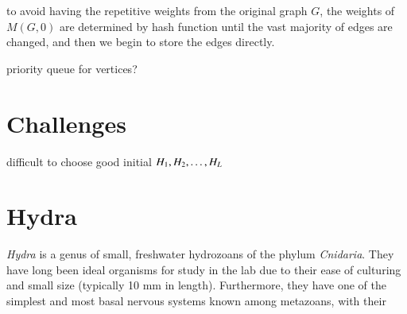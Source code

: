 \documentclass{article}
\begin{document}
to avoid having the repetitive weights from the original graph $G$, the weights of $M(G,0)$ are determined by hash function until the vast majority of edges are changed, and then we begin to store the edges directly.


priority queue for vertices?


\section{Challenges}

difficult to choose good initial $H_1, H_2, \ldots, H_{L}$
\newpage

\section{Hydra}
\textit{Hydra} is a genus of small, freshwater hydrozoans of the phylum \textit{Cnidaria}. They have long been ideal organisms for study in the lab due to their ease of culturing and small size (typically 10 mm in length). Furthermore, they have one of the simplest and most basal nervous systems known among metazoans, with their
\end{document}

